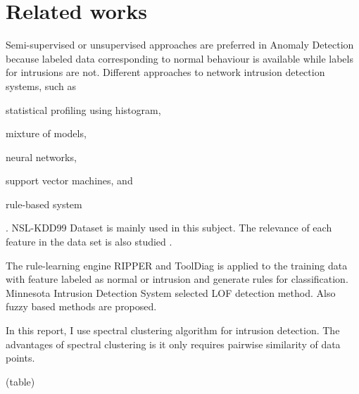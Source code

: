 \section{Related works}
Semi-supervised or unsupervised approaches are preferred in Anomaly Detection\cite{chandola09} because labeled data corresponding to normal behaviour is available while labels for intrusions are not. 
Different approaches to network intrusion detection systems, such as \begin{inparaenum} \item statistical profiling using histogram, \item mixture of models, \item neural networks, \item support vector machines, and \item rule-based system\end{inparaenum}. NSL-KDD99 Dataset is mainly used in this subject\cite{tavallaee09}. 
The relevance of each feature in the data set is also studied\cite{olusola10} \cite{kayacik05}. 

The rule-learning engine RIPPER and ToolDiag is applied to the training data with feature labeled as normal or intrusion and generate rules for classification. 
Minnesota Intrusion Detection System selected LOF detection method. 
Also fuzzy based methods are proposed.


In this report, I use spectral clustering algorithm for intrusion detection. 
The advantages of spectral clustering is it only requires pairwise similarity of data points. 

\begin{table}[h]
(table)
\caption{Intrusion detection approaches}
\label{fig:refSingleRobot1}
\end{table}

